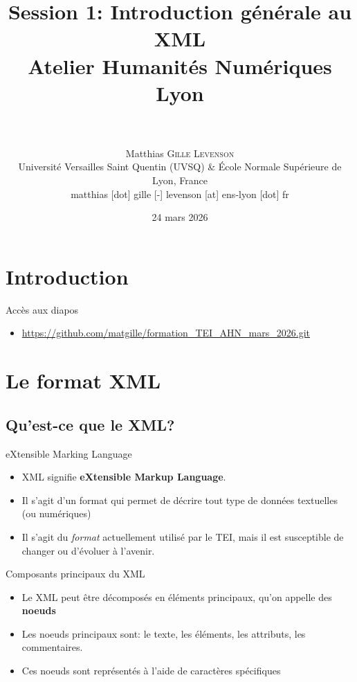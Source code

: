\documentclass[11pt,aspectratio=1610]{beamer}
\date[24 mars 2026]{24 mars 2026}
\author[Matthias \textsc{Gille Levenson}]{\\~\\ Matthias \textsc{Gille Levenson}\\   {\scriptsize Université Versailles Saint Quentin (UVSQ) \& École Normale Supérieure de Lyon, France}\\ {\tiny matthias [dot] gille [-] levenson [at] ens-lyon [dot] fr}\vspace{-1cm}}
\title[Le XML]{Session 1: Introduction générale au XML\\ {\small Atelier Humanités Numériques \\ Lyon}}
\begin{document}
\maketitle

\section{Introduction}


\begin{frame}{Accès aux diapos}
\begin{itemize}
\item \href{https://github.com/matgille/formation_TEI_AHN_mars_2026.git}{https://github.com/matgille/formation\_TEI\_AHN\_mars\_2026.git}
\end{itemize}
\end{frame}

\section{Le format XML}
\subsection{Qu'est-ce que le XML?}

\begin{frame}{eXtensible Marking Language}
\begin{itemize}
\item XML signifie \textbf{eXtensible Markup Language}.
\item Il s'agit d'un format qui permet de décrire tout type de données textuelles (ou numériques) 
\item Il s'agit du \textit{format} actuellement utilisé par le TEI, mais il est susceptible de changer ou d'évoluer à l'avenir.
\end{itemize}
\end{frame}

\begin{frame}{Composants principaux du XML}
\begin{itemize}
\item Le XML peut être décomposés en éléments principaux, qu'on appelle des \textbf{noeuds}
\item Les noeuds principaux sont: le texte, les éléments, les attributs, les commentaires.
\item Ces noeuds sont représentés à l'aide de caractères spécifiques
\end{itemize}
\end{frame}
\end{document}
